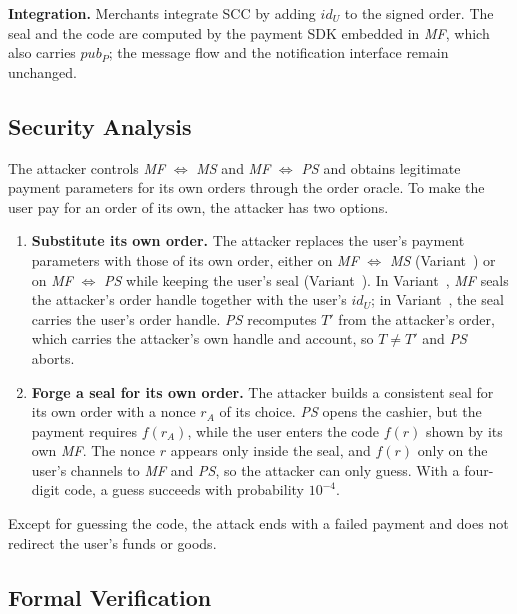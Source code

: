 \textbf{Integration.}
Merchants integrate SCC by adding $id_{U}$ to the signed order.
The seal and the code are computed by the payment SDK embedded in \emph{MF}, which also carries $pub_{P}$; the message flow and the notification interface remain unchanged.

\subsection{Security Analysis}

The attacker controls \emph{MF} $\Longleftrightarrow$ \emph{MS} and \emph{MF} $\Longleftrightarrow$ \emph{PS} and obtains legitimate payment parameters for its own orders through the order oracle.
To make the user pay for an order of its own, the attacker has two options.

\begin{enumerate}[leftmargin=*]
  \item \textbf{Substitute its own order.}
  The attacker replaces the user's payment parameters with those of its own order, either on \emph{MF} $\Longleftrightarrow$ \emph{MS} (Variant~) or on \emph{MF} $\Longleftrightarrow$ \emph{PS} while keeping the user's seal (Variant~).
  In Variant~, \emph{MF} seals the attacker's order handle together with the user's $id_{U}$; in Variant~, the seal carries the user's order handle.
  \emph{PS} recomputes $T'$ from the attacker's order, which carries the attacker's own handle and account, so $T \neq T'$ and \emph{PS} aborts.
  \item \textbf{Forge a seal for its own order.}
  The attacker builds a consistent seal for its own order with a nonce $r_A$ of its choice.
  \emph{PS} opens the cashier, but the payment requires $f(r_A)$, while the user enters the code $f(r)$ shown by its own \emph{MF}.
  The nonce $r$ appears only inside the seal, and $f(r)$ only on the user's channels to \emph{MF} and \emph{PS}, so the attacker can only guess.
  With a four-digit code, a guess succeeds with probability $10^{-4}$.
\end{enumerate}

Except for guessing the code, the attack ends with a failed payment and does not redirect the user's funds or goods.

\subsection{Formal Verification}



